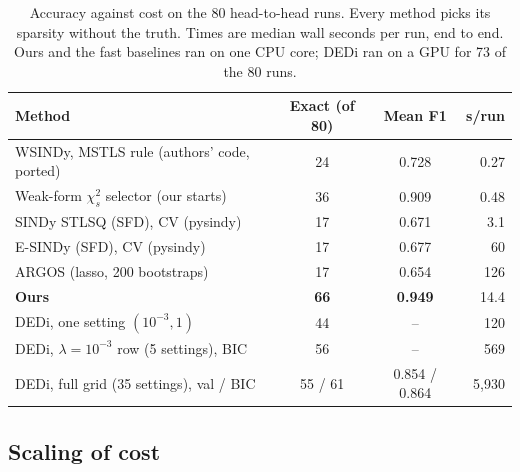 \begin{table}[t]
\centering
\caption{Accuracy against cost on the 80 head-to-head runs. Every method picks its sparsity without the truth. Times are median wall seconds per run, end to end. Ours and the fast baselines ran on one CPU core; DEDi ran on a GPU for 73 of the 80 runs.}
\label{tab:fast}
\small
\begin{tabular}{@{}lccr@{}}
\toprule
Method & Exact (of 80) & Mean F1 & s/run \\
\midrule
WSINDy, MSTLS rule (authors' code, ported) & 24 & 0.728 & 0.27 \\
Weak-form $\chi^2_s$ selector (our starts) & 36 & 0.909 & 0.48 \\
SINDy STLSQ (SFD), CV (pysindy) & 17 & 0.671 & 3.1 \\
E-SINDy (SFD), CV (pysindy) & 17 & 0.677 & 60 \\
ARGOS (lasso, 200 bootstraps) & 17 & 0.654 & 126 \\
\textbf{Ours} & \textbf{66} & \textbf{0.949} & 14.4 \\
DEDi, one setting $(10^{-3},1)$ & 44 & -- & 120 \\
DEDi, $\lambda=10^{-3}$ row (5 settings), BIC & 56 & -- & 569 \\
DEDi, full grid (35 settings), val / BIC & 55 / 61 & 0.854 / 0.864 & 5{,}930 \\
\bottomrule
\end{tabular}
\end{table}

\subsection{Scaling of cost}



